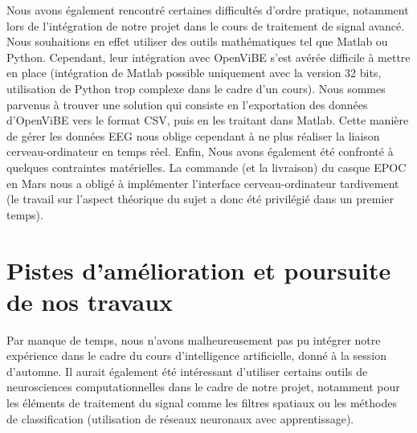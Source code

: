 Nous avons également rencontré certaines difficultés d'ordre pratique, notamment lors de l'intégration de notre projet dans le cours de traitement de signal avancé. Nous souhaitions en effet utiliser des outils mathématiques tel que Matlab ou Python. Cependant, leur intégration avec OpenViBE s'est avérée difficile à mettre en place (intégration de Matlab possible uniquement avec la version 32 bits, utilisation de Python trop complexe dans le cadre d'un cours). Nous sommes parvenus à trouver une solution qui consiste en l'exportation des données d'OpenViBE vers le format CSV, puis en les traitant dans Matlab. Cette manière de gérer les données EEG nous oblige cependant à ne plus réaliser la liaison cerveau-ordinateur en temps réel. Enfin, Nous avons également été confronté à quelques contraintes matérielles. La commande (et la livraison) du casque EPOC en Mars nous a obligé à implémenter l'interface cerveau-ordinateur tardivement (le travail sur l'aspect théorique du sujet a donc été privilégié dans un premier temps).

\section {Pistes d'amélioration et poursuite de nos travaux}
Par manque de temps, nous n'avons malheureusement pas pu intégrer notre expérience dans le cadre du cours d'intelligence artificielle, donné à la session d'automne. Il aurait également été intéressant d'utiliser certains outils de neurosciences computationnelles dans le cadre de notre projet, notamment pour les éléments de traitement du signal comme les filtres spatiaux ou les méthodes de classification (utilisation de réseaux neuronaux avec apprentissage).

